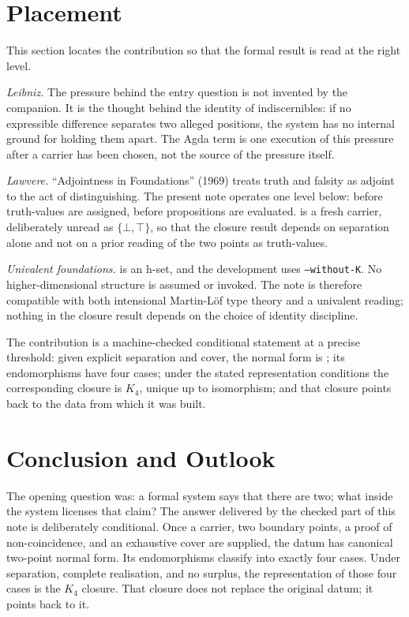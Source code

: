 \documentclass[11pt]{article}
\begin{document}
\section{Placement}

This section locates the contribution so that the formal result is read
at the right level.

\emph{Leibniz.}  The pressure behind the entry question is not invented
by the companion.  It is the thought behind the identity of
indiscernibles: if no
expressible difference separates two alleged positions, the system has
no internal ground for holding them apart.  The Agda term
 is one execution of
this pressure after a carrier has been chosen, not the source of the
pressure itself.

\emph{Lawvere.}  ``Adjointness in Foundations'' (1969) treats truth
and falsity as adjoint to the act of distinguishing.  The present note
operates one level below: before truth-values are assigned, before
propositions are evaluated.   is a fresh carrier,
deliberately unread as $\{\bot,\top\}$, so that the closure result
depends on separation alone and not on a prior reading of the two
points as truth-values.

\emph{Univalent foundations.}   is an h-set, and the
development uses \texttt{--without-K}.  No higher-dimensional
structure is assumed or invoked.  The note is therefore compatible
with both intensional Martin-Löf type theory and a univalent reading;
nothing in the closure result depends on the choice of identity
discipline.

The contribution is a machine-checked conditional statement at a precise
threshold: given explicit separation and cover, the normal form is
; its endomorphisms have four cases; under the stated
representation conditions the corresponding closure is $K_4$, unique up
to isomorphism; and that closure points back to the data from which it
was built.

\section{Conclusion and Outlook}

The opening question was: a formal system says that there are two; what
inside the system licenses that claim?  The answer delivered by the
checked part of this note is deliberately conditional.  Once a carrier,
two boundary points, a proof of non-coincidence, and an exhaustive cover
are supplied, the datum has canonical two-point normal form.  Its
endomorphisms classify into exactly four cases.  Under separation,
complete realisation, and no surplus, the representation of those four
cases is the $K_4$ closure.  That closure does not replace the original
datum; it points back to it.
\end{document}
